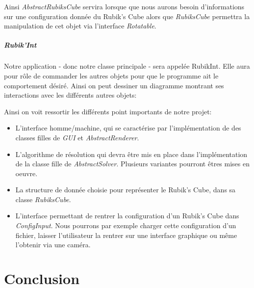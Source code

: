 \documentclass[a4paper]{report}
\begin{document}
Ainsi \textit{AbstractRubiksCube} servira lorsque que nous aurons besoin d'informations sur une configuration donnée du Rubik's Cube alors que \textit{RubiksCube} permettra la manipulation de cet objet via l'interface \textit{Rotatable}. 


\paragraph{Rubik'Int} Notre application - donc notre classe principale - sera appelée RubikInt. Elle aura pour rôle de commander les autres objets pour que le programme ait le comportement désiré. Ainsi on peut dessiner un diagramme montrant ses interactions avec les différents autres objets:

\begin{center}
\end{center}
Ainsi on voit ressortir les différents point importants de notre projet: 
\begin{itemize}
    \item L'interface homme/machine, qui se caractérise par l'implémentation de des classes filles de \textit{GUI} et \textit{AbstractRenderer}.
    \item L'algorithme de résolution qui devra être mis en place dans l'implémentation de la classe fille de \textit{AbstractSolver}. Plusieurs variantes pourront êtres mises en oeuvre.
    \item La structure de donnée choisie pour représenter le Rubik's Cube, dans sa classe \textit{RubiksCube}.
    \item L'interface permettant de rentrer la configuration d'un Rubik's Cube dans \textit{ConfigInput}. Nous pourrons par exemple charger cette configuration d'un fichier, laisser l'utilisateur la rentrer sur une interface graphique ou même l'obtenir via une caméra.
\end{itemize}


\chapter*{Conclusion}
\end{document}
